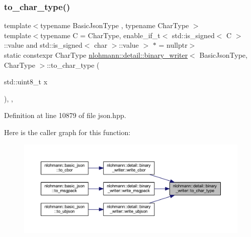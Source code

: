 \subsubsection{\texorpdfstring{to\_char\_type()}{to\_char\_type()}\hspace{0.1cm}{\footnotesize\ttfamily [1/4]}}
{\footnotesize\ttfamily template$<$typename Basic\+Json\+Type , typename Char\+Type $>$ \\
template$<$typename C  = Char\+Type, enable\+\_\+if\+\_\+t$<$ std\+::is\+\_\+signed$<$ C $>$\+::value and std\+::is\+\_\+signed$<$ char $>$\+::value $>$ $\ast$  = nullptr$>$ \\
static constexpr Char\+Type \mbox{\hyperlink{classnlohmann_1_1detail_1_1binary__writer}{nlohmann\+::detail\+::binary\+\_\+writer}}$<$ Basic\+Json\+Type, Char\+Type $>$\+::to\+\_\+char\+\_\+type (\begin{DoxyParamCaption}\item[{std\+::uint8\+\_\+t}]{x }\end{DoxyParamCaption})\hspace{0.3cm}{\ttfamily [inline]}, {\ttfamily [static]}, {\ttfamily [noexcept]}}



Definition at line 10879 of file json.\+hpp.

Here is the caller graph for this function\+:
\nopagebreak
\begin{figure}[H]
\begin{center}
\leavevmode
\includegraphics[width=350pt]{classnlohmann_1_1detail_1_1binary__writer_ab77aa48692bd4e64e4f051ce6aeb6d2d_icgraph}
\end{center}
\end{figure}
\mbox{\label{classnlohmann_1_1detail_1_1binary__writer_a5e46f0dd3550901b15cf85265808d1ec}} 

